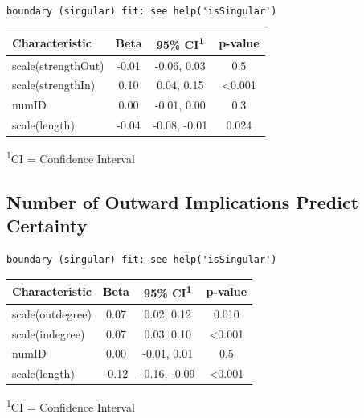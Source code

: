 \documentclass[
  .7em,
  letterpaper,
  DIV=11,
  numbers=noendperiod]{scrartcl}
\begin{document}
\begin{verbatim}
boundary (singular) fit: see help('isSingular')
\end{verbatim}

\captionsetup[table]{labelformat=empty,skip=1pt}
\setlength{\LTpost}{0mm}
\begin{longtable}{lccc}
\toprule
\textbf{Characteristic} & \textbf{Beta} & \textbf{95\% CI}\textsuperscript{1} & \textbf{p-value} \\ 
\midrule
scale(strengthOut) & -0.01 & -0.06, 0.03 & 0.5 \\ 
scale(strengthIn) & 0.10 & 0.04, 0.15 & <0.001 \\ 
numID & 0.00 & -0.01, 0.00 & 0.3 \\ 
scale(length) & -0.04 & -0.08, -0.01 & 0.024 \\ 
\bottomrule
\end{longtable}
\begin{minipage}{\linewidth}
\textsuperscript{1}CI = Confidence Interval\\
\end{minipage}

\hypertarget{number-of-outward-implications-predict-certainty}{%
\subsection{Number of Outward Implications Predict
Certainty}\label{number-of-outward-implications-predict-certainty}}

\begin{verbatim}
boundary (singular) fit: see help('isSingular')
\end{verbatim}

\captionsetup[table]{labelformat=empty,skip=1pt}
\setlength{\LTpost}{0mm}
\begin{longtable}{lccc}
\toprule
\textbf{Characteristic} & \textbf{Beta} & \textbf{95\% CI}\textsuperscript{1} & \textbf{p-value} \\ 
\midrule
scale(outdegree) & 0.07 & 0.02, 0.12 & 0.010 \\ 
scale(indegree) & 0.07 & 0.03, 0.10 & <0.001 \\ 
numID & 0.00 & -0.01, 0.01 & 0.5 \\ 
scale(length) & -0.12 & -0.16, -0.09 & <0.001 \\ 
\bottomrule
\end{longtable}
\begin{minipage}{\linewidth}
\textsuperscript{1}CI = Confidence Interval\\
\end{minipage}
\end{document}
